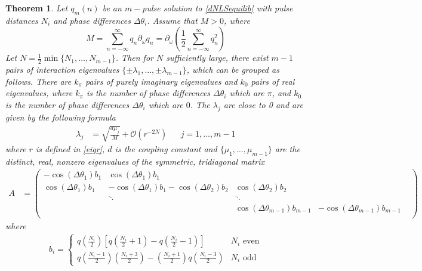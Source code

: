 \documentclass[12pt]{article}
\newtheorem{theorem}{Theorem}
\begin{document}
\begin{theorem}\label{dNLSeigtheorem}
Let $q_m(n)$ be an $m-$pulse solution to \eqref{dNLSequilib} with pulse distances $N_i$ and phase differences $\Delta\theta_i$. Assume that $M > 0$, where
\[
M = \sum_{n=-\infty}^\infty q_n \partial_\omega q_n = \partial_\omega \left( \frac{1}{2} \sum_{n=-\infty}^\infty q_n^2 \right)
\]
Let $N = \frac{1}{2} \min\{ N_1, \dots, N_{m-1}\}$. Then for $N$ sufficiently large, there exist $m-1$ pairs of interaction eigenvalues $\{\pm \lambda_1, \dots, \pm \lambda_{m-1}\}$, which can be grouped as follows. There are $k_\pi$ pairs of purely imaginary eigenvalues and $k_0$ pairs of real eigenvalues, where $k_\pi$ is the number of phase differences $\Delta\theta_i$ which are $\pi$, and $k_0$ is the number of phase differences $\Delta\theta_i$ which are $0$. The $\lambda_j$ are close to 0 and are given by the following formula
\begin{align}\label{eigsDNLS}
\lambda_j &= \sqrt{\frac{d \mu_j}{M}} + \mathcal{O}(r^{-2N}) && j = 1, \dots, m-1
\end{align}
where $r$ is defined in \eqref{eigr}, $d$ is the coupling
constant and $\{ \mu_1, \dots, \mu_{m-1} \}$ are the distinct, real, nonzero eigenvalues of the symmetric, tridiagonal matrix
\begin{align}\label{dNLSmatrixA}
A &= \begin{pmatrix}
-\cos(\Delta\theta_1) b_1 & \cos(\Delta\theta_1) b_1 & & &  \\
\cos(\Delta\theta_1) b_1 & -\cos(\Delta\theta_1) b_1 - \cos(\Delta\theta_2) b_2 & \cos(\Delta\theta_2) b_2 \\
& \ddots & \ddots \\
& &  \cos(\Delta\theta_{m-1}) b_{m-1} & -\cos(\Delta\theta_{m-1}) b_{m-1}  \\
\end{pmatrix}
\end{align}
where
\begin{align}\label{bieq}
b_i = \begin{cases}
q\left(\frac{N_i}{2}\right) \left[ q\left(\frac{N_i}{2} + 1\right) - q\left(\frac{N_i}{2} - 1\right) \right] & N_i \text{ even} \\
q\left(\frac{N_i-1}{2}\right)\left(\frac{N_i+3}{2}\right) 
- \left(\frac{N_i+1}{2}\right)q\left(\frac{N_i-3}{2}\right) & N_i \text{ odd}
\end{cases}
\end{align}
\end{theorem}
\end{document}
